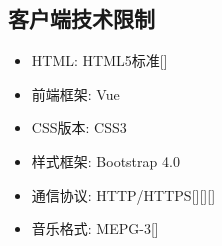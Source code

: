 \subsection{客户端技术限制}

\begin{itemize}
	\item HTML: HTML5标准[\cite{hickson2011html5}]
	\item 前端框架: Vue
	\item CSS版本: CSS3
	\item 样式框架: Bootstrap 4.0
	\item 通信协议: HTTP/HTTPS[\cite{berners1996hypertext}][\cite{fielding1999hypertext}][\cite{rescorla2000http}]
	\item 音乐格式: MEPG-3[\cite{le1991mpeg}]
\end{itemize}

